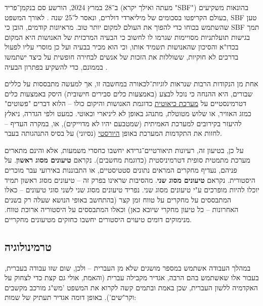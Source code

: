 \documentclass[]{article}
\theoremstyle{definition}
\begin{document}
\begin{multicols}{2}
		ב־28 במרץ 2024, הורשע סם בנקמן־פריד (מעתה ואילך יקרא "SBF") בהונאות משקיעים בעולם הקריפטו בסכומים של מיליארדי דולרים, ונאסר ל־25 שנה \cite{SBF}. לאורך המשפט, SBF טען שהשתמש בכוחו כדי להפוך את העולם למקום יותר טוב. מראיונות קודמים, הובן כי SBF תמך בגישות תועלתניות מסויימות שגרמו לו לחשוב כי הבעיה המרכזית של האנושות היא המקום בכדו"א והסיכון שהאנושות תשמיד אותו, וכי הוא מכיר בבעיה ועל כן מוסרי עליו לפעול בדרכים לא חוקיות, ששוללות את הזכות של אנשים לבחירה חופשית על כיצד ישתמשו בממונם, כדי להשקיע בפתרון הבעיה \cite{SBFU}.
		
		אחת מן הנקודות הרבות שנראות לוגיות־לכאורה במחשבה זו, אך למעשה מתבססות על כללים שבורים, היא ההנחה כי נוכל לבצע (באמצעות כלים סבירים חישובית) היסק באמצעות כלים דטרמינסטיים על \href{https://he.wikipedia.org/wiki/%D7%AA%D7%95%D7%A8%D7%AA_%D7%94%D7%9B%D7%90%D7%95%D7%A1}{מערכת כיאוטית} כדוגמת האנושות והיקום כולו – הלוא דברים "פשוטים" כמזג האוויר, או שלוש מטוטלת, מתנהג באופן לא ליניארי וכאוטי. כמעט ולפי הגדרה, ניאלץ להיעזר בקירובים למערכת האמיתית (שמטבעם יהיו לא מדוייקים), או, במקרה העדיף – לחזות את התקדמות המערכת באופן \href{https://he.wikipedia.org/wiki/%D7%94%D7%99%D7%95%D7%A8%D7%99%D7%A1%D7%98%D7%99%D7%A7%D7%94}{היורסטי} (נסיוני) על בסיס התנהגותה בעבר. 
		
		על כן, בטיעון זה, רעיונות תיאורטיים־גרידא יחשבו כחסרי משמעות, אלא והינם מתארים מערכת מתמטית סופית דטרמיניסטית (כדוגמת מחשבים). נקראם \textbf{טיעונים מסוג ראשון}. על פניהם, נעדיף מחקרים המראים נתונים סטטיסטיים, או התבוננות באירועי עבר מוכרים היסטורית. נקראם \textbf{טיעונים מסוג שני}. מהסיבות שראינו בפרק זה – טיעונים מסוג ראשון תמיד יוכלו להיות מופרכים ע"י טיעונים מסוג שני. נפריד טיעונים מסוג שני לשני סוגי טיעונים – כאלו המתבססים על מחקרים על טווח זמן קצר (בהתחשב באופי הנושא שעלה רק בשנים האחרונות – כל טיעון מחקרי שיובא כאן) וכאלו המתבססים על היסטוריה ארוכת טווח. מנימוקים דומים טיעוים היסטורים יחשבו כחזקים מטיעונים מחקריים. 
		
		\subsection{טרמינולוגיה}
		במהלך העבודה אשתמש במספר מושגים שלא מן העברית – ולכן, שום שזו עבודה בעברית, בעבור אלו שאשתמש בהם הרבה, אגדיר מקבילה עברית (והאמת, אולי גם קצת כדי לצחוק על האקדמיה ללשון העברית, שכן באמת ובתמים קשה לקרוא את המשפט 'מש"ג מורכב מקשבים וקר"שים'). באופן דומה אגדיר תעתיק של שמות:
	\end{multicols}
	
\end{document}
